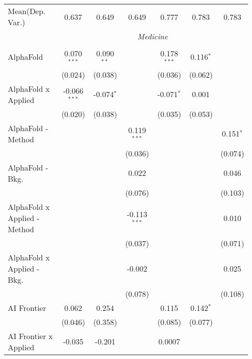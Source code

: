 \begin{tabular}{lcccccc}
Mean(Dep. Var.) & 0.637 & 0.649 & 0.649 & 0.777 & 0.783 & 0.783 \\
 & \multicolumn{6}{c}{\textit{Medicine}} \\ \\
   AlphaFold                      & 0.070$^{***}$  & 0.090$^{**}$  &                & 0.178$^{***}$ & 0.116$^{*}$  &   \\   
                                  & (0.024)        & (0.038)       &                & (0.036)       & (0.062)      &   \\   
   AlphaFold x Applied            & -0.066$^{***}$ & -0.074$^{*}$  &                & -0.071$^{*}$  & 0.001        &   \\   
                                  & (0.020)        & (0.038)       &                & (0.035)       & (0.053)      &   \\   
   AlphaFold - Method             &                &               & 0.119$^{***}$  &               &              & 0.151$^{*}$\\   
                                  &                &               & (0.036)        &               &              & (0.074)\\   
   AlphaFold - Bkg.               &                &               & 0.022          &               &              & 0.046\\   
                                  &                &               & (0.076)        &               &              & (0.103)\\   
   AlphaFold x Applied - Method   &                &               & -0.113$^{***}$ &               &              & 0.010\\   
                                  &                &               & (0.037)        &               &              & (0.071)\\   
   AlphaFold x Applied - Bkg.     &                &               & -0.002         &               &              & 0.025\\   
                                  &                &               & (0.078)        &               &              & (0.108)\\   
   AI Frontier                    & 0.062          & 0.254         &                & 0.115         & 0.142$^{*}$  &   \\   
                                  & (0.046)        & (0.358)       &                & (0.085)       & (0.077)      &   \\   
   AI Frontier x Applied          & -0.035         & -0.201        &                & 0.0007        &              &   \\   

\end{tabular}

